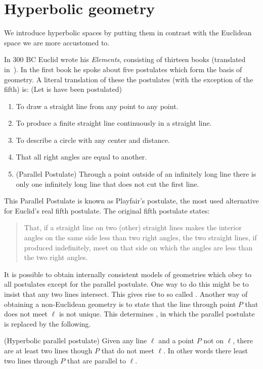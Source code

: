 \chapter{Hyperbolic geometry}\label{hyperbolic}
We introduce hyperbolic spaces by putting them in contrast with the Euclidean space we are more accustomed to.

In 300 BC Euclid wrote his \textit{Elements}, consisting of thirteen books (translated in~\cite{Fitzpatrick2008euclidElementsGeometry}). In the first book he spoke about five postulates which form the basis of geometry. A literal translation of these the postulates (with the exception of the fifth) is: (Let is have been postulated)
\begin{enumerate}
    \item To draw a straight line from any point to any point.
    \item To produce a finite straight line continuously in a straight line.
    \item To describe a circle with any center and distance.
    \item That all right angles are equal to another.
    \item (Parallel Postulate) Through a point outside of an infinitely long line there is only one infinitely long line that does not cut the first line.
\end{enumerate}

This Parallel Postulate is known as Playfair’s postulate, the most used alternative for Euclid’s real fifth postulate. The original fifth postulate states:
\begin{quote}
    That, if a straight line on two (other) straight lines makes the interior angles on the same side less than two right angles, the two straight lines, if produced indefinitely, meet on that side on which the angles are less than the two right angles.
\end{quote}


It is possible to obtain internally consistent models of geometries which obey to all postulates except for the parallel postulate. One way to do this might be to insist that any two lines intersect. This gives rise to so called . Another way of obtaining a non-Euclidean geometry is to state that the line through point $P$ that does not meet $\ell$ is not unique. This determines , in which the parallel postulate is replaced by the following.

\begin{definition}(Hyperbolic parallel postulate)
    Given any line $\ell$ and a point $P$ not on $\ell$, there are at least two lines though $P$ that do not meet $\ell$. In other words there least two lines through $P$ that are parallel to $\ell$.
\end{definition}

